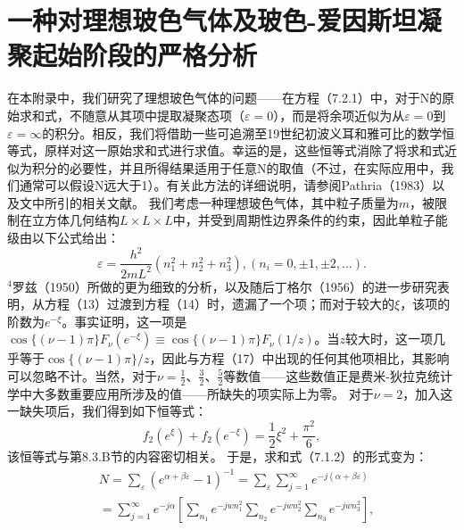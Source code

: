 \section{一种对理想玻色气体及玻色-爱因斯坦凝聚起始阶段的严格分析}\label{f-ux4e00ux79cdux5bf9ux7406ux60f3ux73bbux8272ux6c14ux4f53ux53caux73bbux8272-ux7231ux56e0ux65afux5766ux51ddux805aux8d77ux59cbux9636ux6bb5ux7684ux4e25ux683cux5206ux6790}
在本附录中，我们研究了理想玻色气体的问题——在方程（7.2.1）中，对于N的原始求和式，不随意从其项中提取凝聚态项（\(\varepsilon=0\)），而是将余项近似为从\(\varepsilon=0\)到\(\varepsilon=\infty\)的积分。相反，我们将借助一些可追溯至19世纪初波义耳和雅可比的数学恒等式，原样对这一原始求和式进行求值。幸运的是，这些恒等式消除了将求和式近似为积分的必要性，并且所得结果适用于任意N的取值（不过，在实际应用中，我们通常可以假设N远大于1）。有关此方法的详细说明，请参阅Pathria（1983）以及文中所引的相关文献。
我们考虑一种理想玻色气体，其中粒子质量为\(m\)，被限制在立方体几何结构\(L \times L \times L\)中，并受到周期性边界条件的约束，因此单粒子能级由以下公式给出：
\begin{equation}\tag{17.6.1}\label{eq:17.6.1}
\varepsilon = \frac { h ^{2} } { 2 m L ^{2} } \left( n _ { 1 } ^{2} + n _ { 2 } ^{2} + n _ { 3 } ^{2} \right) ,  ( n _ { i } = 0 , \pm 1 , \pm 2 , \ldots ) .
\end{equation}
\(^{4}\)罗兹（1950）所做的更为细致的分析，以及随后丁格尔（1956）的进一步研究表明，从方程（13）过渡到方程（14）时，遗漏了一个项；而对于较大的\(\xi\)，该项的阶数为\(e^{-\xi}\)。事实证明，这一项是\(\cos\{(\nu-1)\pi\}F_{\nu}(e^{-\xi})\equiv\cos\{(\nu-1)\pi\}F_{\nu}(1/z)\)。当\(z\)较大时，这一项几乎等于\(\cos\{(\nu-1)\pi\}/z\)，因此与方程（17）中出现的任何其他项相比，其影响可以忽略不计。当然，对于\(\nu=\frac{1}{2}\)、\(\frac{3}{2}\)、\(\frac{5}{2}\)等数值——这些数值正是费米-狄拉克统计学中大多数重要应用所涉及的值——所缺失的项实际上为零。
对于\(\nu=2\)，加入这一缺失项后，我们得到如下恒等式：
\begin{equation}\tag{17.6.2}\label{eq:17.6.2}
f _ { 2 } ( e ^{\xi} ) + f _ { 2 } ( e ^{- \xi} ) = \frac { 1 } { 2 } \xi ^{2} + \frac { \pi ^{2} } { 6 } ,
\end{equation}
该恒等式与第8.3.B节的内容密切相关。
于是，求和式（7.1.2）的形式变为：
\begin{equation}\tag{17.6.3}\label{eq:17.6.3}
\begin{array}{rl} & { N = \sum _ { \varepsilon } \left( e ^{\alpha + \beta \varepsilon} - 1 \right) ^{- 1} = \sum _ { \varepsilon } \sum _ { j = 1 } ^{\infty} e ^{- j ( \alpha + \beta \varepsilon )} } \\& { = \sum _ { j = 1 } ^{\infty} e ^{- j \alpha} \left[ \sum _ { n _ { 1 } } e ^{- j w n _ { 1} ^{2} } \sum _ { n _ { 2 } } e ^{- j w n _ { 2} ^{2} } \sum _ { n _ { 3 } } e ^{- j w n _ { 3} ^{2} } \right] , } \end{array}
\end{equation}
